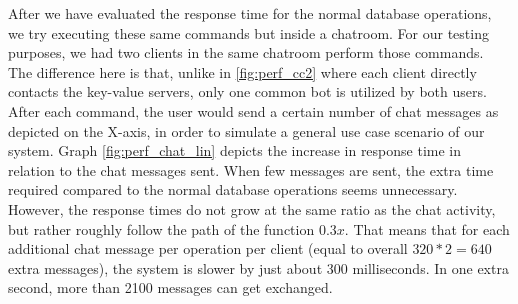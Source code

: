 After we have evaluated the response time for the normal database operations, we try executing these same commands but inside a chatroom. For our testing purposes, we had two clients in the same chatroom perform those commands. The difference here is that, unlike in \ref{fig:perf_cc2} where each client directly contacts the key-value servers, only one common bot is utilized by both users. After each command, the user would send a certain number of chat messages as depicted on the X-axis, in order to simulate a general use case scenario of our system. Graph \ref{fig:perf_chat_lin} depicts the increase in response time in relation to the chat messages sent.
When few messages are sent, the extra time required compared to the normal database operations seems unnecessary. 
However, the response times do not grow at the same ratio as the chat activity, but rather roughly follow the path of the function \begin{math}0.3x\end{math}. That means that for each additional chat message per operation per client (equal to overall \begin{math}320 * 2 = 640\end{math} extra messages), the system is slower by just about 300 milliseconds. In one extra second, more than 2100 messages can get exchanged. %